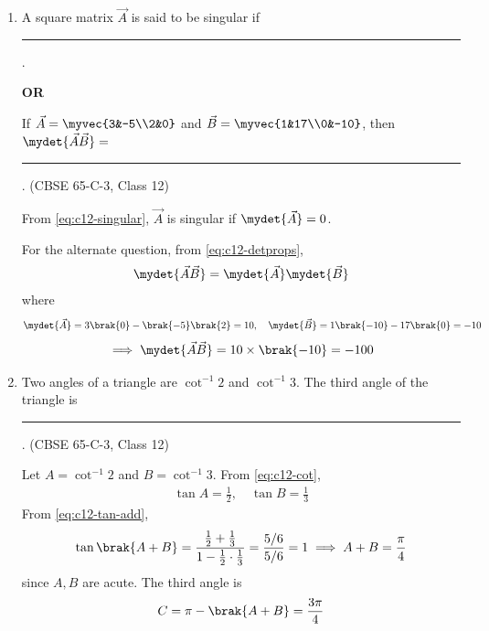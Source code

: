 \begin{enumerate}[label=\thesubsection.\arabic*., ref=\thesubsection.\theenumi]
\item A square matrix $\vec{A}$ is said to be singular if \rule{1cm}{0.2pt}.
\begin{center}\textbf{OR}\end{center}
If $\vec{A}=\myvec{3&-5\\2&0}$ and $\vec{B}=\myvec{1&17\\0&-10}$, then $\mydet{\vec{A}\vec{B}}=$ \rule{1cm}{0.2pt}.
\hfill (CBSE 65-C-3, Class 12)
 
\solution From \eqref{eq:c12-singular}, $\vec{A}$ is singular if $\mydet{\vec{A}}=0$.
 
For the alternate question, from \eqref{eq:c12-detprops},
\begin{align}
\mydet{\vec{A}\vec{B}} = \mydet{\vec{A}}\mydet{\vec{B}}
\end{align}
where
\begin{align}
\mydet{\vec{A}} = 3\brak{0}-\brak{-5}\brak{2} = 10,\quad
\mydet{\vec{B}} = 1\brak{-10}-17\brak{0} = -10
\end{align}
\begin{align}
\implies \mydet{\vec{A}\vec{B}} = 10\times\brak{-10} = -100
\end{align}
 
\begin{center}
\end{center}
 
\item Two angles of a triangle are $\cot^{-1}2$ and $\cot^{-1}3$. The third angle of the triangle is \rule{1cm}{0.2pt}.
\hfill (CBSE 65-C-3, Class 12)
 
\solution Let $A=\cot^{-1}2$ and $B=\cot^{-1}3$. From \eqref{eq:c12-cot},
\begin{align}
\tan A = \frac{1}{2},\quad \tan B = \frac{1}{3}
\end{align}
From \eqref{eq:c12-tan-add},
\begin{align}
\tan\brak{A+B} = \frac{\frac{1}{2}+\frac{1}{3}}{1-\frac{1}{2}\cdot\frac{1}{3}}
= \frac{5/6}{5/6} = 1
\implies A+B = \frac{\pi}{4}
\end{align}
since $A,B$ are acute. The third angle is
\begin{align}
C = \pi-\brak{A+B} = \frac{3\pi}{4}
\end{align}
 
\begin{center}
\end{center}
 

\end{enumerate}
